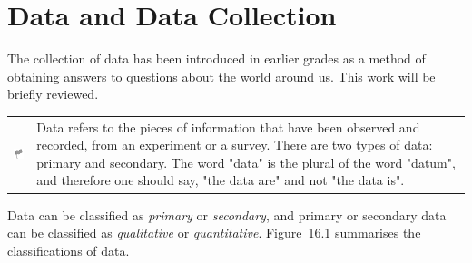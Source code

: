             \section{ Data and Data Collection}
            \nopagebreak
         \label{m39403*id200309}The collection of data has been introduced in earlier grades as a method of obtaining answers to questions about the world around us. This work will be briefly reviewed.\par 
%             
%           
\par
            \label{m39403*fhsst!!!underscore!!!id85}\begin{definition}
	  \begin{tabular*}{15 cm}{m{15 mm}m{}}
	\hspace*{-50pt}  \includegraphics[width=0.5in]{col11306.imgs/psflag2.png}   & \Definition{   \label{id2616525}\textbf{ Data }} { \label{m39403*meaningfhsst!!!underscore!!!id85}
          \label{m39403*id200337}Data refers to the pieces of information that have been observed and recorded, from an experiment or a survey. There are two types of data: primary and secondary. The word "data" is the plural of the word "datum", and therefore one should say, "the data are" and not "the data is". \par 
           } 
      \end{tabular*}
      \end{definition}
          \label{m39403*id200350}Data can be classified as \textit{primary} or \textit{secondary}, and primary or secondary data can be classified as \textit{qualitative} or \textit{quantitative}. Figure~16.1 summarises the classifications of data.\par 
    \setcounter{subfigure}{0}
